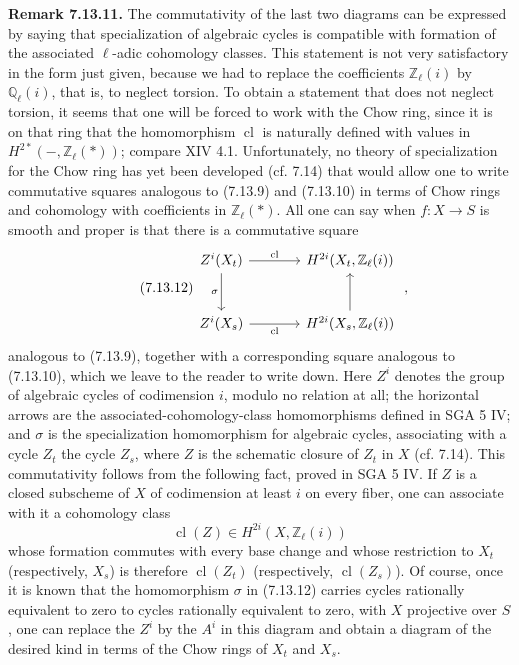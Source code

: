 \textbf{Remark 7.13.11.}
The commutativity of the last two diagrams can be expressed by saying that
specialization of algebraic cycles is compatible with formation of the
associated $\ell$-adic cohomology classes. This statement is not very
satisfactory in the form just given, because we had to replace the
coefficients $\mathbb Z_\ell(i)$ by $\mathbb Q_\ell(i)$, that is, to neglect
torsion. To obtain a statement that does not neglect torsion, it seems that
one will be forced to work with the Chow ring, since it is on that ring that
the homomorphism $\operatorname{cl}$ is naturally defined with values in
$H^{2*}(-,\mathbb Z_\ell(*))$; compare XIV 4.1. Unfortunately, no theory of
specialization for the Chow ring has yet been developed (cf. 7.14) that would
allow one to write commutative squares analogous to (7.13.9) and (7.13.10) in
terms of Chow rings and cohomology with coefficients in
$\mathbb Z_\ell(*)$. All one can say when $f:X\to S$ is smooth and proper is
that there is a commutative square
\begin{equation}\tag{7.13.12}
\begin{tikzcd}[column sep=large,row sep=large]
Z^i(X_t) \arrow[r,"\operatorname{cl}"] \arrow[d,"\sigma"'] &
H^{2i}(X_t,\mathbb Z_\ell(i))\\
Z^i(X_s) \arrow[r,"\operatorname{cl}"'] &
H^{2i}(X_s,\mathbb Z_\ell(i)) \arrow[u]
\end{tikzcd}
\;,
\end{equation}
analogous to (7.13.9), together with a corresponding square analogous to
(7.13.10), which we leave to the reader to write down. Here $Z^i$ denotes the
group of algebraic cycles of codimension $i$, modulo no relation at all; the
horizontal arrows are the associated-cohomology-class homomorphisms defined
in SGA 5 IV; and $\sigma$ is the specialization homomorphism for algebraic
cycles, associating with a cycle $Z_t$ the cycle $Z_s$, where $Z$ is the
schematic closure of $Z_t$ in $X$ (cf. 7.14). This commutativity follows from
the following fact, proved in SGA 5 IV. If $Z$ is a closed subscheme of $X$
of codimension at least $i$ on every fiber, one can associate with it a
cohomology class
\[
\operatorname{cl}(Z)\in H^{2i}(X,\mathbb Z_\ell(i))
\]
whose formation commutes with every base change and whose restriction to
$X_t$ (respectively, $X_s$) is therefore
$\operatorname{cl}(Z_t)$ (respectively, $\operatorname{cl}(Z_s)$). Of course,
once it is known that the homomorphism $\sigma$ in (7.13.12) carries cycles
rationally equivalent to zero to cycles rationally equivalent to zero, with
$X$ projective over $S$,
one can replace the $Z^i$ by the $A^i$ in this diagram and obtain a diagram
of the desired kind in terms of the Chow rings of $X_t$ and $X_s$.

